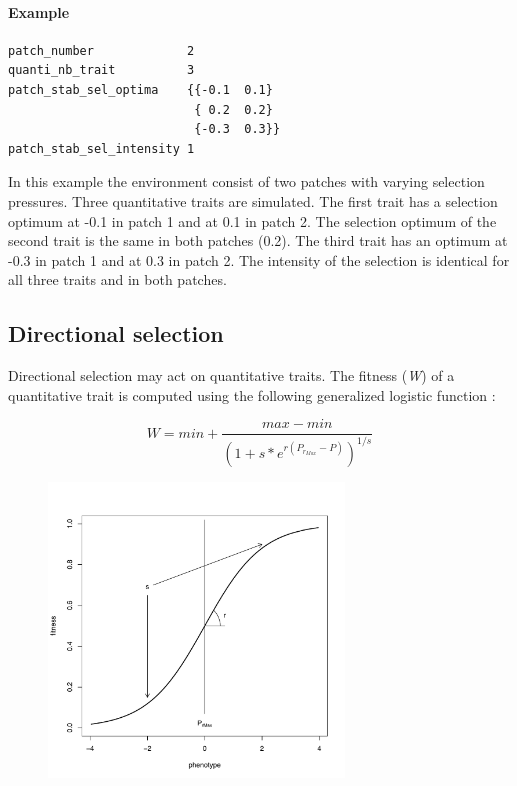 \documentclass[letterpaper,12pt,oneside]{book}
\begin{document}
\paragraph{Example}\hspace*{\fill}
\begin{lstlisting}[frame=single]
patch_number             2
quanti_nb_trait          3
patch_stab_sel_optima    {{-0.1  0.1}							
                          { 0.2  0.2}
                          {-0.3  0.3}}	
patch_stab_sel_intensity 1													
\end{lstlisting}
In this example the environment consist of two patches with varying selection pressures. Three quantitative traits are simulated. The first trait has a selection optimum at -0.1 in patch 1 and at 0.1 in patch 2. The selection optimum of the second trait is the same in both patches (0.2). The third trait has an optimum at -0.3 in patch 1 and at 0.3 in patch 2. The intensity of the selection is identical for all three traits and in both patches.    

\subsection{Directional selection}
Directional selection may act on quantitative traits. The fitness (\textit{W}) of a quantitative trait is computed using the following generalized logistic function \citep{Richards_1959}: 

		\[ W = min + \frac{max-min}{(1+s*e^{r(P_{r_{Max}}-P)})^{1/s}} \] 

\begin{figure}[h]
	\centering
		\includegraphics[width=0.70\textwidth]{directional-selection.pdf}
	\label{fig:directional-selection}
\end{figure}
\end{document}
